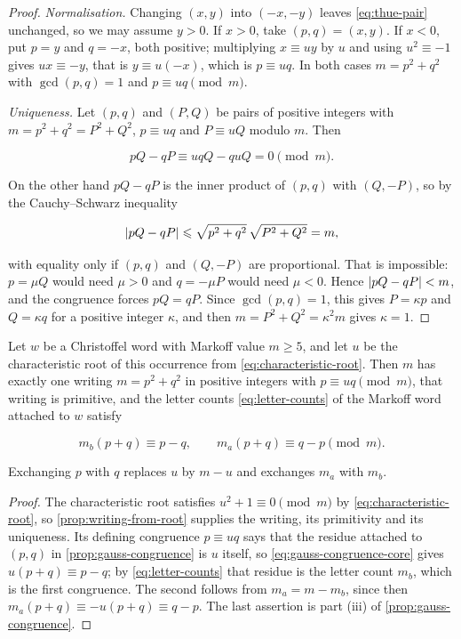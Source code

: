 \begin{proof}
\emph{Normalisation.} Changing $(x,y)$ into $(-x,-y)$ leaves
\cref{eq:thue-pair} unchanged, so we may assume $y>0$. If $x>0$, take
$(p,q)=(x,y)$. If $x<0$, put $p=y$ and $q=-x$, both positive; multiplying
$x\equiv uy$ by $u$ and using $u^2\equiv-1$ gives $ux\equiv-y$, that is
$y\equiv u(-x)$, which is $p\equiv uq$. In both cases $m=p^2+q^2$ with
$\gcd(p,q)=1$ and $p\equiv uq\pmod m$.

\emph{Uniqueness.} Let $(p,q)$ and $(P,Q)$ be pairs of positive integers with
$m=p^2+q^2=P^2+Q^2$, $p\equiv uq$ and $P\equiv uQ$ modulo $m$. Then

\begin{equation}
 pQ-qP\equiv uqQ-quQ=0\pmod m.
\end{equation}

On the other hand $pQ-qP$ is the inner product of $(p,q)$ with $(Q,-P)$, so by
the Cauchy--Schwarz inequality

\begin{equation}
 \lvert pQ-qP\rvert\leqslant\sqrt{p^2+q^2}\,\sqrt{P^2+Q^2}=m,
\end{equation}

with equality only if $(p,q)$ and $(Q,-P)$ are proportional. That is
impossible: $p=\mu Q$ would need $\mu>0$ and $q=-\mu P$ would need $\mu<0$.
Hence $\lvert pQ-qP\rvert<m$, and the congruence forces $pQ=qP$. Since
$\gcd(p,q)=1$, this gives $P=\kappa p$ and $Q=\kappa q$ for a positive integer
$\kappa$, and then $m=P^2+Q^2=\kappa^2m$ gives $\kappa=1$.
\end{proof}

\begin{corollary}
\label{cor:writing-letter-counts}
Let $w$ be a Christoffel word with Markoff value $m\geqslant5$, and let $u$ be
the characteristic root of this occurrence from
\cref{eq:characteristic-root}. Then $m$ has exactly one writing $m=p^2+q^2$
in positive integers with $p\equiv uq\pmod m$, that writing is primitive, and
the letter counts \cref{eq:letter-counts} of the Markoff word attached to $w$
satisfy

\begin{equation}
 m_b(p+q)\equiv p-q,
 \qquad
 m_a(p+q)\equiv q-p
 \pmod m.
 \label{eq:letter-counts-congruence}
\end{equation}

Exchanging $p$ with $q$ replaces $u$ by $m-u$ and exchanges $m_a$ with $m_b$.
\end{corollary}

\begin{proof}
The characteristic root satisfies $u^2+1\equiv0\pmod m$ by
\cref{eq:characteristic-root}, so \cref{prop:writing-from-root} supplies the
writing, its primitivity and its uniqueness. Its defining congruence
$p\equiv uq$ says that the residue attached to $(p,q)$ in
\cref{prop:gauss-congruence} is $u$ itself, so
\cref{eq:gauss-congruence-core} gives $u(p+q)\equiv p-q$; by
\cref{eq:letter-counts} that residue is the letter count $m_b$, which is the
first congruence. The second follows from $m_a=m-m_b$, since then
$m_a(p+q)\equiv-u(p+q)\equiv q-p$. The last assertion is part (iii) of
\cref{prop:gauss-congruence}.
\end{proof}

